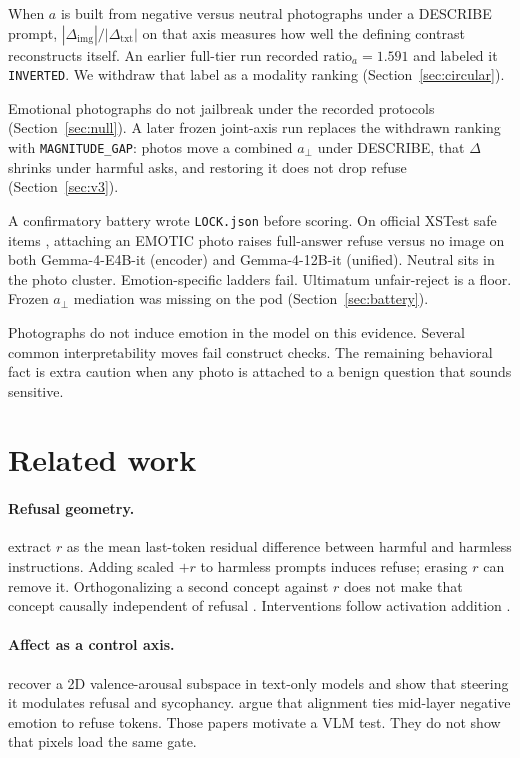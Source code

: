 \documentclass{article}
\begin{document}
When $a$ is built from negative versus neutral photographs under a DESCRIBE prompt, $|\Delta_{\mathrm{img}}|/|\Delta_{\mathrm{txt}}|$ on that axis measures how well the defining contrast reconstructs itself. An earlier full-tier run recorded $\mathrm{ratio}_a=1.591$ and labeled it \texttt{INVERTED}. We withdraw that label as a modality ranking (Section~\ref{sec:circular}).

Emotional photographs do not jailbreak under the recorded protocols (Section~\ref{sec:null}). A later frozen joint-axis run replaces the withdrawn ranking with \texttt{MAGNITUDE\_GAP}: photos move a combined $a_\perp$ under DESCRIBE, that $\Delta$ shrinks under harmful asks, and restoring it does not drop refuse (Section~\ref{sec:v3}).

A confirmatory battery wrote \texttt{LOCK.json} before scoring. On official XSTest safe items \citep{rottger2024xstest}, attaching an EMOTIC photo raises full-answer refuse versus no image on both Gemma-4-E4B-it (encoder) and Gemma-4-12B-it (unified). Neutral sits in the photo cluster. Emotion-specific ladders fail. Ultimatum unfair-reject is a floor. Frozen $a_\perp$ mediation was missing on the pod (Section~\ref{sec:battery}).

Photographs do not induce emotion in the model on this evidence. Several common interpretability moves fail construct checks. The remaining behavioral fact is extra caution when any photo is attached to a benign question that sounds sensitive.

\section{Related work}
\label{sec:related}

\paragraph{Refusal geometry.}
\citet{arditi2024refusal} extract $r$ as the mean last-token residual difference between harmful and harmless instructions. Adding scaled $+r$ to harmless prompts induces refuse; erasing $r$ can remove it. Orthogonalizing a second concept against $r$ does not make that concept causally independent of refusal \citep{wollschlager2025geometry}. Interventions follow activation addition \citep{turner2023activation,rimsky2024steering}.

\paragraph{Affect as a control axis.}
\citet{sun2026valence} recover a 2D valence-arousal subspace in text-only models and show that steering it modulates refusal and sycophancy. \citet{zhou2024alignment} argue that alignment ties mid-layer negative emotion to refuse tokens. Those papers motivate a VLM test. They do not show that pixels load the same gate.
\end{document}

